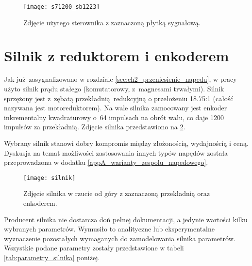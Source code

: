 \begin{figure}[h]
    \centering
    \texttt{[image: s71200\_sb1223]}
    \caption{Zdjęcie użytego sterownika z zaznaczoną płytką sygnałową.}
    \label{fig:sterownik_plytka_sygn}
\end{figure}

\section{Silnik z reduktorem i enkoderem}
\label{sec:ch3_uklad_napedowy}

Jak już zasygnalizowano w rozdziale \ref{sec:ch2_przeniesienie_napedu}, w pracy użyto silnik prądu stałego (komutatorowy, z~magnesami trwałymi). Silnik sprzężony jest z~zębatą przekładnią redukcyjną o przełożeniu \num{18,75}:\num{1} (całość nazywana jest motoreduktorem). Na wale silnika zamocowany jest enkoder inkrementalny kwadraturowy o~64 impulsach na obrót wału, co daje 1200 impulsów za przekładnią. Zdjęcie silnika przedstawiono na \cref{fig:silnik}.

Wybrany silnik stanowi dobry kompromis między złożonością, wydajnością i ceną. Dyskusja na temat możliwości zastosowania innych typów napędów została przeprowadzona w dodatku \ref{appA_warianty_zespolu_napedowego}.

\begin{figure}[h]
    \centering
    \texttt{[image: silnik]}
    \caption{Zdjęcie silnika w rzucie od góry z zaznaczoną przekładnią oraz enkoderem.}
    \label{fig:silnik}
\end{figure}

Producent silnika nie dostarcza doń pełnej dokumentacji, a jedynie wartości kilku wybranych parametrów. Wymusiło to analityczne lub eksperymentalne wyznaczenie pozostałych wymaganych do zamodelowania silnika parametrów. Wszystkie podane parametry zostały przedstawione w tabeli \ref{tab:parametry_silnika} poniżej.

